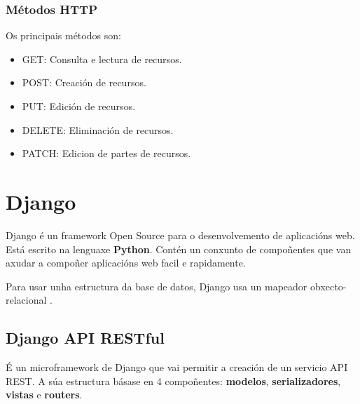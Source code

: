 \documentclass[11pt,twoside]{book}
\begin{document}
\subsubsection{Métodos HTTP}

Os principais métodos son:

\begin{itemize}
    \item GET: Consulta e lectura de recursos.
    \item POST: Creación de recursos.
    \item PUT: Edición de recursos.
    \item DELETE: Eliminación de recursos.
    \item PATCH: Edicion de partes de recursos.
\end{itemize}

\section{Django}

Django é un framework Open Source para o desenvolvemento de aplicacións web. Está escrito na lenguaxe \textbf{Python}. Contén un conxunto de compoñentes que van axudar a compoñer aplicacións web facil e rapidamente.

Para usar unha estructura da base de datos, Django usa un mapeador obxecto-relacional \cite{DjangoDoc}.


\subsection{Django API RESTful}

É un microframework de Django que vai permitir a creación de un servicio API REST. A súa estructura básase en 4 compoñentes: \textbf{modelos}, \textbf{serializadores}, \textbf{vistas} e \textbf{routers}.
\end{document}
